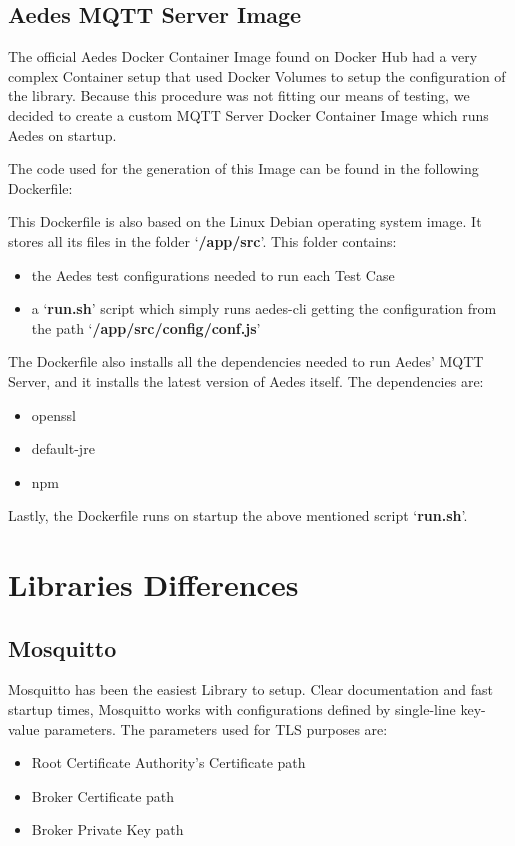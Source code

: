 \documentclass[binding=0.6cm,noexaminfo]{sapthesis}
\begin{document}
\subsection{Aedes MQTT Server Image}
The official Aedes Docker Container Image found on Docker Hub had a very complex Container setup that used Docker Volumes to setup the configuration of the library. Because this procedure was not fitting our means of testing, we decided to create a custom MQTT Server Docker Container Image which runs Aedes on startup.

The code used for the generation of this Image can be found in the following Dockerfile:


This Dockerfile is also based on the Linux Debian operating system image. It stores all its files in the folder `\textbf{/app/src}'. This folder contains:
\begin{itemize}
	\item the Aedes test configurations needed to run each Test Case
	\item a `\textbf{run.sh}' script which simply runs aedes-cli getting the configuration from the path `\textbf{/app/src/config/conf.js}'
\end{itemize}
The Dockerfile also installs all the dependencies needed to run Aedes' MQTT Server, and it installs the latest version of Aedes itself.
The dependencies are:
\begin{itemize}
	\item openssl
	\item default-jre
	\item npm
\end{itemize}
Lastly, the Dockerfile runs on startup the above mentioned script `\textbf{run.sh}'.

\section{Libraries Differences}
\subsection{Mosquitto}
Mosquitto has been the easiest Library to setup. Clear documentation and fast startup times, Mosquitto works with configurations defined by single-line key-value parameters. The parameters used for TLS purposes are:

\begin{itemize}
	\item Root Certificate Authority's Certificate path
	\item Broker Certificate path
	\item Broker Private Key path
\end{itemize}
\end{document}
